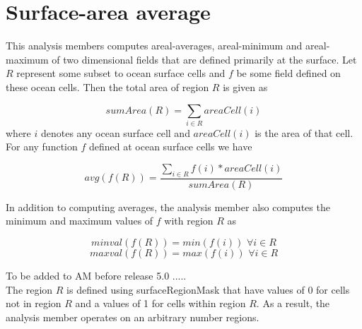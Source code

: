 \section{Surface-area average}
\label{sec:surface_area_average}

This analysis members computes areal-averages, areal-minimum and areal-maximum of two dimensional fields that are defined primarily at the surface. Let $R$ represent some subset to ocean surface cells and $f$ be some field defined on these ocean cells. Then the total area of region $R$ is given as

\begin{equation}
sumArea(R) = \sum_{i \in R} areaCell(i)
\end{equation}
where $i$ denotes any ocean surface cell and $areaCell(i)$ is the area of that cell. For any function $f$ defined at ocean surface cells we have

\begin{equation}
avg(f(R)) = \frac{\sum_{i \in R} f(i)*areaCell(i)}{sumArea(R)}
\end{equation}

In addition to computing averages, the analysis member also computes the minimum and maximum values of $f$ with region $R$ as

\begin{equation}
minval(f(R))=min(f(i)) \, \, \forall i \in R
\end{equation}
\begin{equation}
maxval(f(R))=max(f(i)) \, \, \forall i \in R
\end{equation}

{\noindent}To be added to AM before release 5.0 .....\\
The region $R$ is defined using surfaceRegionMask that have values of 0 for cells not in region $R$ and a values of 1 for cells within region $R$. As a result, the analysis member operates on an arbitrary number regions.
